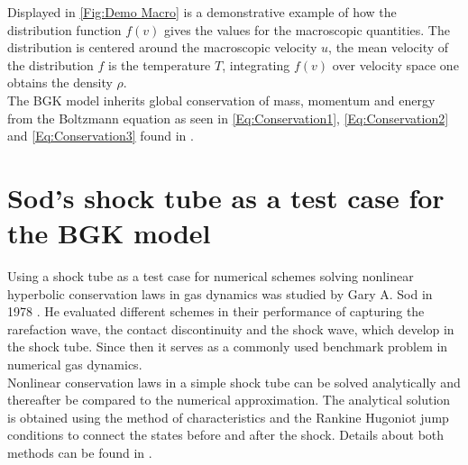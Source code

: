 Displayed in \cref{Fig:Demo Macro} is a demonstrative example of how the distribution function \(f(v)\) gives the values for the macroscopic quantities. The distribution is centered around the macroscopic velocity \(u\), the mean velocity of the distribution \(f\) is the temperature \(T\), integrating \(f(v)\) over velocity space one obtains the density \(\rho\).\\ 

The BGK model inherits global conservation of mass, momentum and energy from the Boltzmann equation as seen in \cref{Eq:Conservation1}, \cref{Eq:Conservation2} and \cref{Eq:Conservation3} found in \cite{puppo2019kinetic}.
\section{Sod's shock tube as a test case for the BGK model} \label{Sec:FeaturesSOD}
Using a shock tube as a test case for numerical schemes solving nonlinear hyperbolic conservation laws in gas dynamics was studied by Gary A. Sod in 1978 \cite{Sod}. He evaluated different schemes in their performance of capturing the rarefaction wave, the contact discontinuity and the shock wave, which develop in the shock tube. Since then it serves as a commonly used benchmark problem in numerical gas dynamics.\\
Nonlinear conservation laws in a simple shock tube can be solved analytically and thereafter be compared to the numerical approximation. The analytical solution is obtained using the method of characteristics and the Rankine Hugoniot jump conditions to connect the states before and after the shock. Details about both methods can be found in \cite{CFD1}.\\

